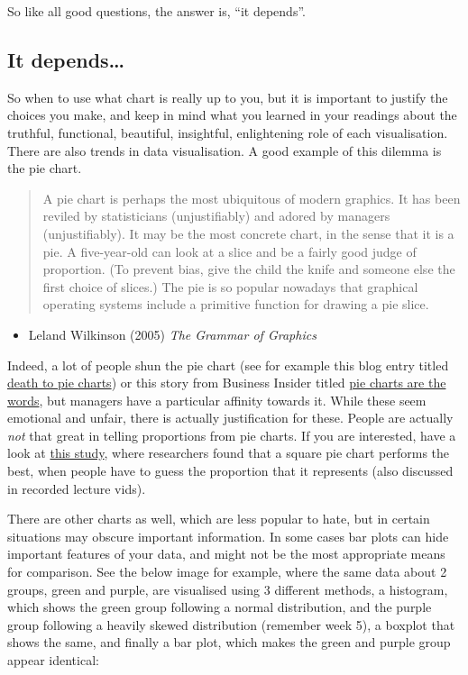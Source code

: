 \documentclass[
]{book}
\providecommand{\tightlist}{%
  \setlength{\itemsep}{0pt}\setlength{\parskip}{0pt}}
\begin{document}
So like all good questions, the answer is, ``it depends''.

\hypertarget{it-depends}{%
\subsection{It depends\ldots{}}\label{it-depends}}

So when to use what chart is really up to you, but it is important to justify the choices you make, and keep in mind what you learned in your readings about the truthful, functional, beautiful, insightful, enlightening role of each visualisation. There are also trends in data visualisation. A good example of this dilemma is the pie chart.

\begin{quote}
A pie chart is perhaps the most ubiquitous of modern graphics. It has been reviled by statisticians (unjustifiably) and adored by managers (unjustifiably). It may be the most concrete chart, in the sense that it is a pie. A five-year-old can look at a slice and be a fairly good judge of proportion. (To prevent bias, give the child the knife and someone else the first choice of slices.) The pie is so popular nowadays that graphical operating systems include a primitive function for drawing a pie slice.
\end{quote}

\begin{itemize}
\tightlist
\item
  Leland Wilkinson (2005) \emph{The Grammar of Graphics}
\end{itemize}

Indeed, a lot of people shun the pie chart (see for example this blog entry titled \href{http://www.storytellingwithdata.com/blog/2011/07/death-to-pie-charts}{death to pie charts}) or this story from Business Insider titled \href{http://www.businessinsider.com/pie-charts-are-the-worst-2013-6?IR=T}{pie charts are the words}, but managers have a particular affinity towards it. While these seem emotional and unfair, there is actually justification for these. People are actually \emph{not} that great in telling proportions from pie charts. If you are interested, have a look at \href{https://eagereyes.org/blog/2016/a-reanalysis-of-a-study-about-square-pie-charts-from-2009}{this study}, where researchers found that a square pie chart performs the best, when people have to guess the proportion that it represents (also discussed in recorded lecture vids).

There are other charts as well, which are less popular to hate, but in certain situations may obscure important information. In some cases bar plots can hide important features of your data, and might not be the most appropriate means for comparison. See the below image for example, where the same data about 2 groups, green and purple, are visualised using 3 different methods, a histogram, which shows the green group following a normal distribution, and the purple group following a heavily skewed distribution (remember week 5), a boxplot that shows the same, and finally a bar plot, which makes the green and purple group appear identical:
\end{document}
